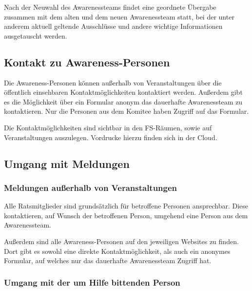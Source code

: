 \documentclass{article}
\begin{document}
Nach der Neuwahl des Awarenessteams findet eine geordnete Übergabe zusammen mit dem alten und dem neuen Awarenessteam statt, bei der unter anderem aktuell geltende 
Ausschlüsse und andere wichtige Informationen ausgetauscht werden.

\subsection{Kontakt zu Awareness-Personen}
Die Awareness-Personen können außerhalb von Veranstaltungen über die öffentlich einsehbaren Kontaktmöglichkeiten kontaktiert werden. %
Außerdem gibt es die Möglichkeit über ein Formular anonym das dauerhafte Awarenessteam zu kontaktieren. Nur die Personen aus dem Komitee haben Zugriff auf das Formular. %

Die Kontaktmöglichkeiten sind sichtbar in den FS-Räumen, sowie auf Veranstaltungen auszulegen. Vordrucke hierzu finden sich in der Cloud. 

\subsection{Umgang mit Meldungen}
\subsubsection{Meldungen außerhalb von Veranstaltungen}
Alle Ratsmitglieder sind grundsätzlich für betroffene Personen ansprechbar. Diese kontaktieren, auf Wunsch der betroffenen Person, umgehend eine Person aus dem Awarenessteam. 

Außerdem sind alle Awareness-Personen auf den jeweiligen Websites zu finden. Dort gibt es sowohl eine direkte Kontaktmöglichkeit, als auch ein anonymes Formular, auf welches 
nur das dauerhafte Awarenessteam Zugriff hat.

\subsubsection{Umgang mit der um Hilfe bittenden Person}
\end{document}
